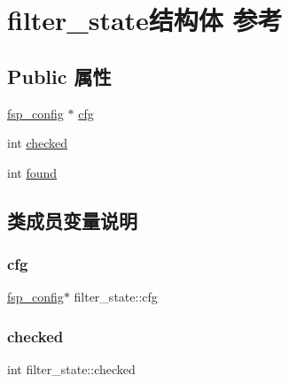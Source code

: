 \hypertarget{structfilter__state}{}\section{filter\+\_\+state结构体 参考}
\label{structfilter__state}
\subsection*{Public 属性}
\begin{DoxyCompactItemize}
\item 
\mbox{\hyperlink{structfsp__config}{fsp\+\_\+config}} $\ast$ \mbox{\hyperlink{structfilter__state_a79683bec2e531eda4ad71fbce93acd9d}{cfg}}
\item 
int \mbox{\hyperlink{structfilter__state_a7b24681ea0b21de5f4ea3d7cac4333c4}{checked}}
\item 
int \mbox{\hyperlink{structfilter__state_a9de821f396efeed58ebcd0ce1f6ebcab}{found}}
\end{DoxyCompactItemize}


\subsection{类成员变量说明}
\mbox{\label{structfilter__state_a79683bec2e531eda4ad71fbce93acd9d}} 
\subsubsection{\texorpdfstring{cfg}{cfg}}
{\footnotesize\ttfamily \mbox{\hyperlink{structfsp__config}{fsp\+\_\+config}}$\ast$ filter\+\_\+state\+::cfg}

\mbox{\label{structfilter__state_a7b24681ea0b21de5f4ea3d7cac4333c4}} 
\subsubsection{\texorpdfstring{checked}{checked}}
{\footnotesize\ttfamily int filter\+\_\+state\+::checked}

\mbox{\label{structfilter__state_a9de821f396efeed58ebcd0ce1f6ebcab}} 
